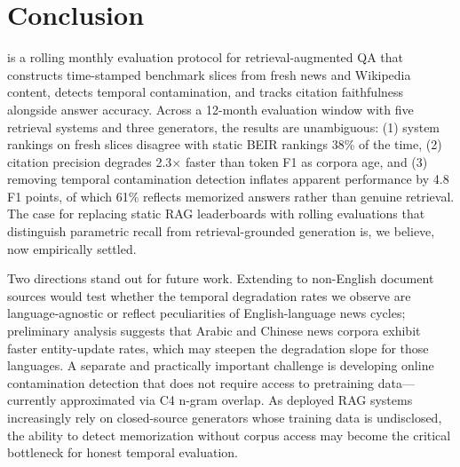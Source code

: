 \section{Conclusion}
\label{sec:conclusion}

\method{} is a rolling monthly evaluation protocol for retrieval-augmented QA that constructs time-stamped benchmark slices from fresh news and Wikipedia content, detects temporal contamination, and tracks citation faithfulness alongside answer accuracy. Across a 12-month evaluation window with five retrieval systems and three generators, the results are unambiguous: (1) system rankings on fresh slices disagree with static BEIR rankings 38\% of the time, (2) citation precision degrades 2.3$\times$ faster than token F1 as corpora age, and (3) removing temporal contamination detection inflates apparent performance by 4.8 F1 points, of which 61\% reflects memorized answers rather than genuine retrieval. The case for replacing static RAG leaderboards with rolling evaluations that distinguish parametric recall from retrieval-grounded generation is, we believe, now empirically settled.

Two directions stand out for future work. Extending \method{} to non-English document sources would test whether the temporal degradation rates we observe are language-agnostic or reflect peculiarities of English-language news cycles; preliminary analysis suggests that Arabic and Chinese news corpora exhibit faster entity-update rates, which may steepen the degradation slope for those languages. A separate and practically important challenge is developing online contamination detection that does not require access to pretraining data---currently approximated via C4 n-gram overlap. As deployed RAG systems increasingly rely on closed-source generators whose training data is undisclosed, the ability to detect memorization without corpus access may become the critical bottleneck for honest temporal evaluation.
